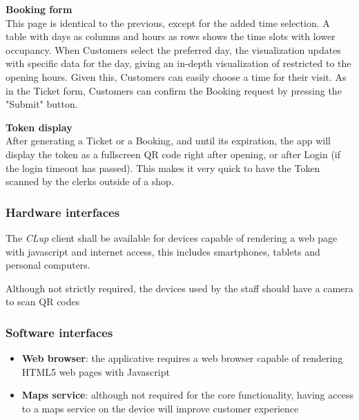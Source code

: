 \textbf{Booking form}\\
\label{page:booking_form}
This page is identical to the previous, except for the added time selection. A table with days as columns and hours as rows shows the time slots with lower occupancy. When Customers select the preferred day, the visualization updates with specific data for the day, giving an in-depth visualization of restricted to the opening hours. Given this, Customers can easily choose a time for their visit. As in the Ticket form, Customers can confirm the Booking request by pressing the "Submit" button.

\textbf{Token display}\\
\label{page:token_show}
After generating a Ticket or a Booking, and until its expiration, the app will display the token as a fullscreen QR code right after opening, or after Login (if the login timeout has passed).
This makes it very quick to have the Token scanned by the clerks outside of a shop.

\subsubsection{Hardware interfaces}
The \emph{CLup} client shall be available for devices capable of rendering a web page with javascript and internet access, this includes smartphones, tablets and personal computers.

Although not strictly required, the devices used by the staff should have a camera to scan QR codes

\subsubsection{Software interfaces}
\begin{itemize}
    \item \textbf{Web browser}: the applicative requires a web browser capable of rendering HTML5 web pages with Javascript
    \item \textbf{Maps service}: although not required for the core functionality, having access to a maps service on the device will improve customer experience
\end{itemize}

